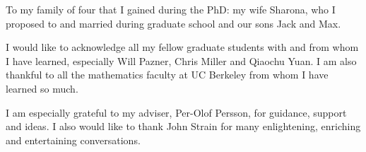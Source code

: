 \documentclass{ucbthesis}
\theoremstyle{definition}
\begin{document}



\maketitle
\copyrightpage



\begin{frontmatter}

\begin{dedication}
\null\vfil
\begin{center}
To my family of four that I gained during the PhD: my wife Sharona, who
I proposed to and married during graduate school and our sons Jack and Max.
\end{center}
\vfil\null
\end{dedication}

\tableofcontents
\clearpage
\listoffigures
\clearpage
\listoftables

\begin{acknowledgements}
I would like to acknowledge all my fellow graduate students with and from
whom I have learned, especially Will Pazner, Chris Miller and
Qiaochu Yuan. I am also thankful to all the mathematics faculty
at UC Berkeley from whom I have learned so much.

I am especially grateful to my adviser, Per-Olof Persson, for guidance,
support and ideas. I also would like to thank John Strain for many
enlightening, enriching and entertaining conversations.
\end{acknowledgements}

\end{frontmatter}

\pagestyle{headings}











\appendix



\end{document}
